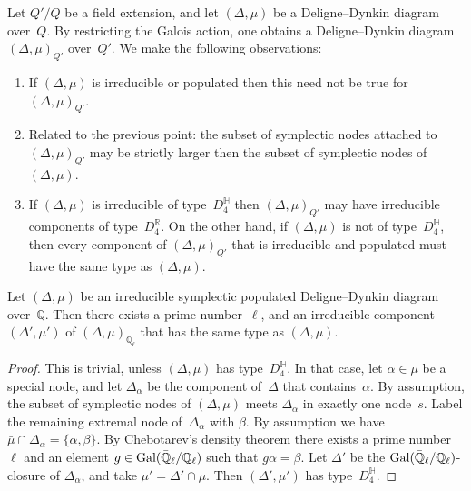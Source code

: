 \documentclass[10pt,twoside,leqno]{article}
\numberwithin{equation}{subsection}
\newcommand{\QQ}{\mathbb{Q}}
\newcommand{\QQbar}{\bar{\QQ}}
\newcommand{\QQl}{\QQ_{\ell}}
\newcommand{\QQlbar}{\QQbar_{\ell}}
\newcommand{\RR}{\mathbb{R}}
\newcommand{\HQ}{\mathbb{H}}
\newcommand{\Gal}{\textnormal{Gal}}
\begin{document}
\begin{remark} %
 \label{type-remarks}
 Let $Q'/Q$ be a field extension,
 and let $(\Delta,\mu)$ be a Deligne--Dynkin diagram over~$Q$.
 By restricting the Galois action,
 one obtains a Deligne--Dynkin diagram $(\Delta,\mu)_{Q'}$ over~$Q'$.
 We make the following observations:
 \begin{enumerate}
  \item If $(\Delta,\mu)$ is irreducible or populated
   then this need not be true for $(\Delta,\mu)_{Q'}$.
  \item Related to the previous point:
   the subset of symplectic nodes attached to $(\Delta,\mu)_{Q'}$
   may be strictly larger then the subset of symplectic nodes of $(\Delta,\mu)$.
  \item If $(\Delta,\mu)$ is irreducible of type~$D_4^\HQ$
   then $(\Delta,\mu)_{Q'}$ may have irreducible components of type~$D_4^\RR$.
   On the other hand, if $(\Delta,\mu)$ is not of type~$D_4^\HQ$,
   then every component of $(\Delta,\mu)_{Q'}$ that is irreducible and populated
   must have the same type as $(\Delta,\mu)$.
 \end{enumerate}
\end{remark}

\begin{lemma} %
 \label{locally-same-type}
 Let $(\Delta, \mu)$ be
 an irreducible symplectic populated Deligne--Dynkin diagram over~$\QQ$.
 Then there exists a prime number~$\ell$, and
 an irreducible component $(\Delta', \mu')$ of $(\Delta, \mu)_{\QQl}$
 that has the same type as $(\Delta, \mu)$.
 \begin{proof}
  This is trivial, unless $(\Delta,\mu)$ has type~$D_4^\HQ$.
  In that case, let $\alpha \in \mu$ be a special node,
  and let $\Delta_\alpha$ be the component of~$\Delta$ that contains~$\alpha$.
  By assumption, the subset of symplectic nodes of $(\Delta,\mu)$
  meets $\Delta_\alpha$ in exactly one node~$s$.
  Label the remaining extremal node of~$\Delta_\alpha$ with $\beta$.
  By assumption we have $\bar\mu \cap \Delta_\alpha = \{\alpha,\beta\}$.
  By Chebotarev's density theorem
  there exists a prime number~$\ell$
  and an element $g \in \Gal(\QQlbar/\QQl)$ such that $g\alpha = \beta$.
  Let $\Delta'$ be the $\Gal(\QQlbar/\QQl)$-closure of $\Delta_\alpha$,
  and take $\mu' = \Delta' \cap \mu$.
  Then $(\Delta', \mu')$ has type~$D_4^\HQ$.
 \end{proof}
\end{lemma}
\end{document}
